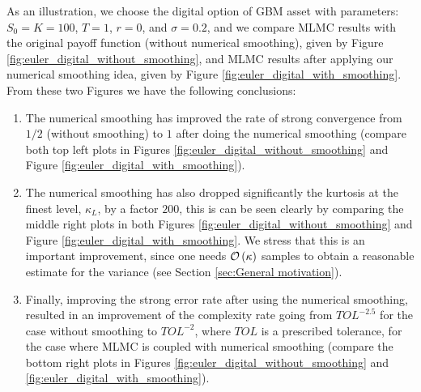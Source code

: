 As an illustration, we choose the digital option of GBM asset with parameters: $S_0=K=100$, $T=1$, $r= 0$, and   $\sigma=0.2$, and we compare MLMC results with the original payoff function (without numerical smoothing), given by Figure \ref{fig:euler_digital_without_smoothing},  and MLMC results after applying our numerical smoothing idea, given by Figure \ref{fig:euler_digital_with_smoothing}. From these two Figures we have the following conclusions:
\begin{enumerate}
\item The numerical smoothing has improved the rate of strong convergence from $1/2$ (without smoothing) to $1$ after doing the numerical smoothing (compare both top left plots in Figures \ref{fig:euler_digital_without_smoothing} and Figure \ref{fig:euler_digital_with_smoothing}).
\item The numerical smoothing has also dropped significantly the kurtosis at the finest level, $\kappa_L$, by a factor $200$, this is can be seen clearly by comparing the middle right plots in both Figures \ref{fig:euler_digital_without_smoothing} and Figure \ref{fig:euler_digital_with_smoothing}. We stress that this is an important improvement, since one needs ${\mathcal{O}}\left(\kappa\right)$ samples  to obtain a reasonable estimate for the variance (see Section \ref{sec:General motivation}).  
\item Finally, improving the strong error rate after using the numerical smoothing, resulted in an improvement of the complexity rate going from $TOL^{-2.5}$ for the case without smoothing to  $TOL^{-2}$, where $TOL$ is a prescribed tolerance, for the case where MLMC is coupled with numerical smoothing (compare the bottom right plots in Figures \ref{fig:euler_digital_without_smoothing} and \ref{fig:euler_digital_with_smoothing}).
\end{enumerate}
\FloatBarrier
